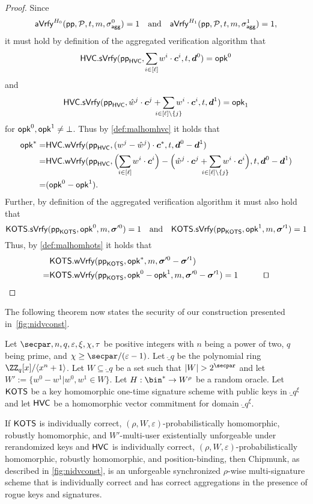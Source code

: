 \begin{proof}
    Since 
    \[
    \mathsf{aVrfy}^{H_0}(\mathsf{pp},\mathcal{P},t,m,\sigma_\mathsf{agg}^0)=1 \quad \text{and} \quad \mathsf{aVrfy}^{H_1}(\mathsf{pp},\mathcal{P},t,m,\sigma_\mathsf{agg}^1)=1,
    \]
    it must hold by definition of the aggregated verification algorithm that 
    \[
      \hvc.\sverify(\hvcparams,\smashoperator{\sum_{i\in[\ell]}} w^i\cdot \vec{c}^i,t,\vec{d}^0) = \opk^0 
    \]
    and
    \[   
      \hvc.\sverify(\hvcparams,\hat{w}^j\cdot \vec{c}^j+\smashoperator{\sum_{i\in[\ell]\setminus\{j\}}} w^i\cdot \vec{c}^i,t,\vec{d}^1)= \opk_1
    \]
    for $\mathsf{opk}^0,\mathsf{opk}^1\neq\bot$.
    Thus by \autoref{def:malhomhvc} it holds that
    \begin{align*}
      \opk^* =& \hvc.\wverify(\hvcparams,(w^j-\hat{w}^j)\cdot \vec{c}^*,t,\vec{d}^0-\vec{d}^1)\\
      =&\hvc.\wverify(\hvcparams,\Bigl(\smashoperator{\sum_{i\in[\ell]}} w^i\cdot \vec{c}^i\Bigr) - \Bigl(\hat{w}^j\cdot \vec{c}^j+\smashoperator{\sum_{i\in[\ell]\setminus\{j\}}} w^i\cdot \vec{c}^i\Bigr),t,\vec{d}^0-\vec{d}^1)\\
       =& (\opk^0-\opk^1).
    \end{align*}
    Further, by definition of the aggregated verification algorithm it must also hold that
    \[
      \mathsf{KOTS}.\mathsf{sVrfy}(\mathsf{pp}_{\mathsf{KOTS}},\mathsf{opk}^0,m,\boldsymbol{\sigma}'^0) =1 \quad \text{and} \quad \mathsf{KOTS}.\mathsf{sVrfy}(\mathsf{pp}_{\mathsf{KOTS}},\mathsf{opk}^1,m,\boldsymbol{\sigma}'^1)=1
    \]
    Thus, by \autoref{def:malhomhots} it holds that
    \begin{align*}
      &\hots.\wverify(\hotsparams,\opk^*,m,\otsig^0-\otsig^1)\\
      =&\hots.\wverify(\hotsparams,\opk^0-\opk^1,m,\otsig^0-\otsig^1)=1 \tag*{\qed}
    \end{align*}
\end{proof}
The following theorem now states the security of our construction presented in~\autoref{fig:nidvconst}.

\begin{theorem}\label{thm:mainconstruction}
Let $\secpar,n,q,\varepsilon,\xi,\chi,\tau$ be positive integers with $n$ being a power of two, $q$ being prime, and $\chi \geq \secpar/(\varepsilon-1)$.
Let $\ring_q$ be the polynomial ring $\ZZ_q[x]/\langle x^n+1\rangle$.
Let $W \subseteq \ring_q$ be a set such that $|W| > 2^\secpar$ and let $W' := \{w^0-w^1| w^0,w^1 \in W\}$.
Let $H : \bin^* \to W^\rho$ be a random oracle.
Let $\mathsf{KOTS}$ be a key homomorphic one-time signature scheme with public keys in $\ring_q^\xi$ and let $\mathsf{HVC}$ be a homomorphic vector commitment for domain $\ring_q^\xi$.

If $\mathsf{KOTS}$ is individually correct, $(\rho,W,\varepsilon)$-probabilistically homomorphic, robustly homomorphic, and $W'$-multi-user existentially unforgeable under rerandomized keys and $\mathsf{HVC}$ is individually correct, $(\rho,W,\varepsilon)$-probabilistically homomorphic, robustly homomorphic, and position-binding, then Chipmunk, as described in \autoref{fig:nidvconst}, is an unforgeable synchronized $\rho$-wise multi-signature scheme that is individually correct and has correct aggregations in the presence of rogue keys and signatures.
\end{theorem}

